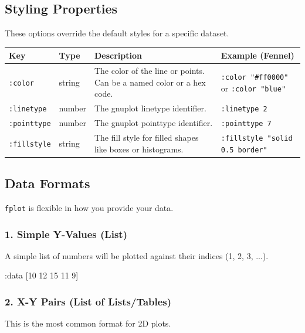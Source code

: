 \documentclass[12pt, letterpaper]{article}
\begin{document}
	\subsection{Styling Properties}
	
	These options override the default styles for a specific dataset.
	
	\begin{table}[htbp]
		\centering
		\begin{tabularx}{\textwidth}{l l X X}
			\toprule
			\textbf{Key} & \textbf{Type} & \textbf{Description} & \textbf{Example (Fennel)} \\
			\midrule
			\texttt{:color} & string & The color of the line or points. Can be a named color or a hex code. & \texttt{:color "\#ff0000"} or \texttt{:color "blue"} \\
			\texttt{:linetype} & number & The gnuplot linetype identifier. & \texttt{:linetype 2} \\
			\texttt{:pointtype} & number & The gnuplot pointtype identifier. & \texttt{:pointtype 7} \\
			\texttt{:fillstyle} & string & The fill style for filled shapes like boxes or histograms. & \texttt{:fillstyle "solid 0.5 border"} \\
			\bottomrule
		\end{tabularx}
	\end{table}
	
	\subsection{Data Formats}
	
	\texttt{fplot} is flexible in how you provide your data.
	
	\subsubsection*{1. Simple Y-Values (List)}
	
	A simple list of numbers will be plotted against their indices (1, 2, 3, ...).
	
	\begin{fennelcode}
:data [10 12 15 11 9]
	\end{fennelcode}
	
	\subsubsection*{2. X-Y Pairs (List of Lists/Tables)}
	
	This is the most common format for 2D plots.
	
\end{document}
